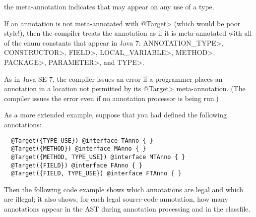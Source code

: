 \documentclass[10pt]{article}
\begin{document}
\noindent
the  meta-annotation indicates that
 may appear on any use of a type.

If an annotation is not meta-annotated with \<@Target> (which would be poor
style!), then the compiler treats the annotation as if it is
meta-annotated with all of the  enum constants
that appear in Java 7: \<ANNOTATION\_TYPE>, \<CONSTRUCTOR>, \<FIELD>,
\<LOCAL\_VARIABLE>, \<METHOD>, \<PACKAGE>, \<PARAMETER>, and \<TYPE>.

As in Java SE 7, the compiler issues an error if a programmer places an
annotation in a location not permitted by its \<@Target> meta-annotation.  (The
compiler issues the error even if no annotation processor is being run.)

As a more extended example, suppose that you had defined the following annotations:

\begin{Verbatim}
  @Target({TYPE_USE}) @interface TAnno { }
  @Target({METHOD}) @interface MAnno { }
  @Target({METHOD, TYPE_USE}) @interface MTAnno { }
  @Target({FIELD}) @interface FAnno { }
  @Target({FIELD, TYPE_USE}) @interface FTAnno { }
\end{Verbatim}

Then the following code example shows which annotations are legal and which
are illegal; it also shows, for each legal source-code annotation, how many
annotations appear in the AST during annotation processing and in the
classfile.
\end{document}
